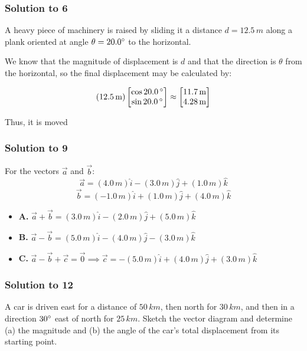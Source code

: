 \documentclass[12pt]{article}
\begin{document}
 
\subsubsection{Solution to 6}

A heavy piece of machinery is raised by sliding it a distance $d=12.5\,\si{m}$ along a plank oriented at angle $\theta = 20.0\degree$ to the horizontal.

We know that the magnitude of displacement is $d$ and that the direction is $\theta$ from the horizontal, so the final displacement may be calculated by:

\[
\left(12.5\,\si{m}\right)\begin{bmatrix}
\cos{20.0\,\degree} \\ \sin{20.0\,\degree}
\end{bmatrix}
\approx
\begin{bmatrix}
11.7\,\si{m}\\ 4.28\,\si{m}
\end{bmatrix}
\]

Thus, it is moved

\subsubsection{Solution to 9}

For the vectors $\vec{a}$ and $\vec{b}$:
\[
\vec{a}=(4.0\,\si{m})\hat{i} - (3.0\,\si{m})\hat{j}+(1.0\,\si{m})\hat{k}
\]
\[
\vec{b}=(-1.0\,\si{m})\hat{i} + (1.0\,\si{m})\hat{j}+(4.0\,\si{m})\hat{k}
\]

\begin{itemize}
\item[] \textbf{A.} $\vec{a}+\vec{b} = \boxed{(3.0\,\si{m})\hat{i} - (2.0\,\si{m})\hat{j}+(5.0\,\si{m})\hat{k}}$
\item[] \textbf{B.} $\vec{a}-\vec{b} = \boxed{(5.0
\,\si{m})\hat{i} - (4.0\,\si{m})\hat{j}-(3.0\,\si{m})\hat{k}}$
\item[] \textbf{C.} $\vec{a} - \vec{b} + \vec{c} = \vec{0} \implies \vec{c} = \boxed{-(5.0
\,\si{m})\hat{i} + (4.0\,\si{m})\hat{j}+(3.0\,\si{m})\hat{k}}$
\end{itemize}

\subsubsection{Solution to 12}

A car is driven east for a distance of $50\,\si{km}$, then north for $30\,\si{km}$, and then in a direction $30\degree$ east of north for $25\,\si{km}$. Sketch the vector diagram and determine (a) the magnitude and (b) the angle of the car's total displacement from its starting point.
\end{document}
